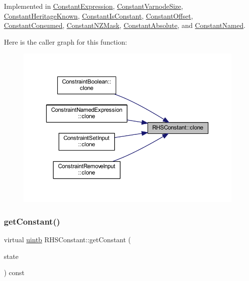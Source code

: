 Implemented in \mbox{\hyperlink{class_constant_expression_aca0a8cd24e458d11ccfd766a1559215c}{Constant\+Expression}}, \mbox{\hyperlink{class_constant_varnode_size_ad8386fe9afbedfaa9fa8c17be0dd697c}{Constant\+Varnode\+Size}}, \mbox{\hyperlink{class_constant_heritage_known_a07568a5e04c406e0a08fe2f07f15ccc1}{Constant\+Heritage\+Known}}, \mbox{\hyperlink{class_constant_is_constant_ac66be1ba7e938346231c0e206f5f8a65}{Constant\+Is\+Constant}}, \mbox{\hyperlink{class_constant_offset_a0e13d942d1a2f59e329796ccae56c238}{Constant\+Offset}}, \mbox{\hyperlink{class_constant_consumed_acb2b2e7bbebab6c8b925819d9a6e05a5}{Constant\+Consumed}}, \mbox{\hyperlink{class_constant_n_z_mask_aa7255ee306a332b4b3cb8b606f8c3821}{Constant\+N\+Z\+Mask}}, \mbox{\hyperlink{class_constant_absolute_abc264546b0dde5e9c02777367aa00424}{Constant\+Absolute}}, and \mbox{\hyperlink{class_constant_named_af2013741889b5f76eb87f77651783e28}{Constant\+Named}}.

Here is the caller graph for this function\+:
\nopagebreak
\begin{figure}[H]
\begin{center}
\leavevmode
\includegraphics[width=350pt]{class_r_h_s_constant_a3e43335a89351a453932a8c0544d5722_icgraph}
\end{center}
\end{figure}
\mbox{\label{class_r_h_s_constant_a941b5d2898cbce985a3ef9c5db6fa458}} 
\subsubsection{\texorpdfstring{getConstant()}{getConstant()}}
{\footnotesize\ttfamily virtual \mbox{\hyperlink{types_8h_a2db313c5d32a12b01d26ac9b3bca178f}{uintb}} R\+H\+S\+Constant\+::get\+Constant (\begin{DoxyParamCaption}\item[{\mbox{\hyperlink{class_unify_state}{Unify\+State}} \&}]{state }\end{DoxyParamCaption}) const\hspace{0.3cm}{\ttfamily [pure virtual]}}



